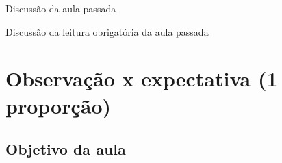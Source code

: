 \documentclass{beamer}
\begin{document}

\begin{frame}{\scriptsize Discussão da aula passada}
  \begin{block}{}
    Discussão da leitura obrigatória da aula passada
  \end{block}
\end{frame}

\section[1 amostra]{Observação x expectativa (1 proporção)}

\subsection{Objetivo da aula}

\end{document}
